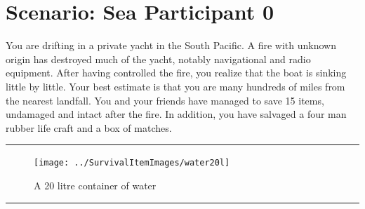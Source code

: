 \documentclass{article}
\begin{document}
    \section*{Scenario: \textmd{Sea} \hfill Participant \textmd{0}}
    \Large You are drifting in a private yacht in the South Pacific. A fire with unknown origin has destroyed much of the yacht, notably navigational and radio equipment. After having controlled the fire, you realize that the boat is sinking little by little. Your best estimate is that you are many hundreds of miles from the nearest landfall. You and your friends have managed to save 15 items, undamaged and intact after the fire. In addition, you have salvaged a four man rubber life craft and a box of matches.
\clearpage
        \par\noindent\rule{\textwidth}{0.4pt}
    \begin{figure}[H]
        \centering
        \begin{minipage}{0.25\textwidth}
            \centering
            \texttt{[image: ../SurvivalItemImages/water20l]}
        \end{minipage}\hfill
        \begin{minipage}{0.7\textwidth}
            \centering
            \Large A 20 litre container of water 
        \end{minipage}
    \end{figure}
    \vspace{-0.8em}
    \noindent\rule{\textwidth}{0.4pt}
            
\end{document}
